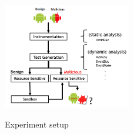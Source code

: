 \begin{figure}[ht]
  \includegraphics[width=0.5\textwidth]{images/setup.png}
  \label{Experiment setup}
  \caption{Experiment setup}
  \label{fig:setup}
\end{figure}




